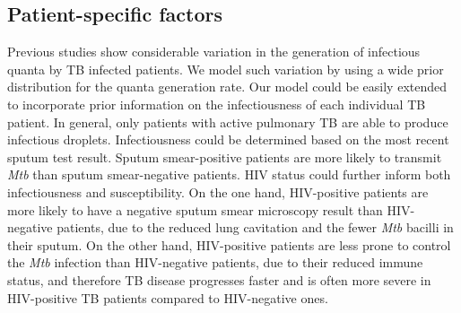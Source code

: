 \documentclass[fleqn,11pt]{wlscirep_supp}
\begin{document}
\subsection{Patient-specific factors}

Previous studies show considerable variation in the generation of infectious quanta by TB infected patients\cite{Escombe2008PLoSMed,Andrews2014JID}. We model such variation by using a wide prior distribution for the quanta generation rate. Our model could be easily extended to incorporate prior information on the infectiousness of each individual TB patient. In general, only patients with active pulmonary TB are able to produce infectious droplets\cite{Rieder1999}. Infectiousness could be determined based on the most recent sputum test result. Sputum smear-positive patients are more likely to transmit \emph{Mtb} than sputum smear-negative patients\cite{Shaw1954ART,Brindle1993AMRRD,Grzybowski1975BIUT}. HIV status could further inform both infectiousness and susceptibility. On the one hand, HIV-positive patients are more likely to have a negative sputum smear microscopy result than HIV-negative patients, due to the reduced lung cavitation and the fewer \emph{Mtb} bacilli in their sputum\cite{Brindle1993AMRRD,Telzak1997CID}. On the other hand, HIV-positive patients are less prone to control the \emph{Mtb} infection than HIV-negative patients, due to their reduced immune status\cite{Forte1992AIDS,Kwan2011CMR,Shen1988CEI}, and therefore TB disease progresses faster and is often more severe in HIV-positive TB patients compared to HIV-negative ones. 



\clearpage


\end{document}
